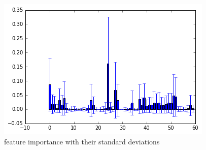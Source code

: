 \documentclass[sigconf]{acmart}
\begin{document}
\begin{figure}
    \centering
    \includegraphics[width=1.0\columnwidth]{project/images/output_17_0.png}
    \caption{feature importance with their standard deviations}
    \label{Featites Format}
\end{figure}
\end{document}

